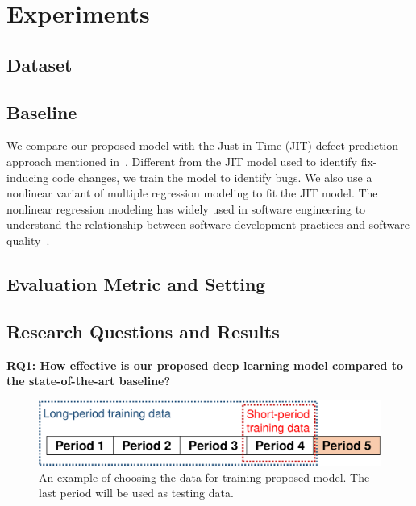 \section{Experiments}
\label{sec:exp}

\subsection{Dataset}
\subsection{Baseline}
\label{sec:baseline}
We compare our proposed model with the Just-in-Time (JIT) defect prediction approach mentioned in~\cite{mcintosh2018fix}. Different from the JIT model used to identify fix-inducing code changes, we train the model to identify bugs. We also use a nonlinear variant of multiple regression modeling to fit the JIT model. The nonlinear regression modeling has widely used in software engineering to understand the relationship between software development practices and software quality~\cite{zhou2011does, morales2015code, mcintosh2016empirical}. 

\subsection{Evaluation Metric and Setting}
\label{sec:metric_setting}

\subsection{Research Questions and Results}
\label{sec:rq_results}

\noindent \textbf{RQ1: How effective is our proposed deep learning model compared to the state-of-the-art baseline?}

\begin{figure}
\center
\includegraphics[scale=0.36]{figs/split.pdf}
\caption{An example of choosing the data for training proposed model. The last period will be used as testing data.}
\label{fig:splitting}
\end{figure}

